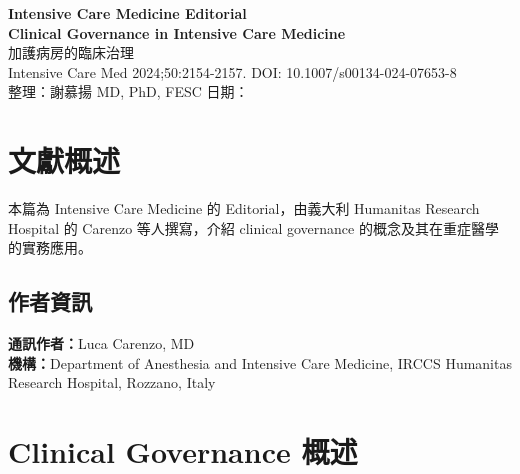 \documentclass[12pt,a4paper]{article}
\begin{document}
\begin{center}
{\LARGE\bfseries\textcolor{emergency_red}{Intensive Care Medicine Editorial}}\\[0.5cm]
{\Large\textbf{Clinical Governance in Intensive Care Medicine}}\\[0.3cm]
{\large 加護病房的臨床治理}\\[0.5cm]
{\normalsize Intensive Care Med 2024;50:2154-2157. DOI: 10.1007/s00134-024-07653-8}\\[0.3cm]
{\normalsize 整理：謝慕揚 MD, PhD, FESC \quad 日期：\mydate}
\end{center}


\tableofcontents
\newpage

\section{文獻概述}

本篇為 Intensive Care Medicine 的 Editorial，由義大利 Humanitas Research Hospital 的 Carenzo 等人撰寫，介紹 clinical governance 的概念及其在重症醫學的實務應用。

\subsection{作者資訊}
\textbf{通訊作者：}Luca Carenzo, MD\\
\textbf{機構：}Department of Anesthesia and Intensive Care Medicine, IRCCS Humanitas Research Hospital, Rozzano, Italy

\section{Clinical Governance 概述}
\end{document}
